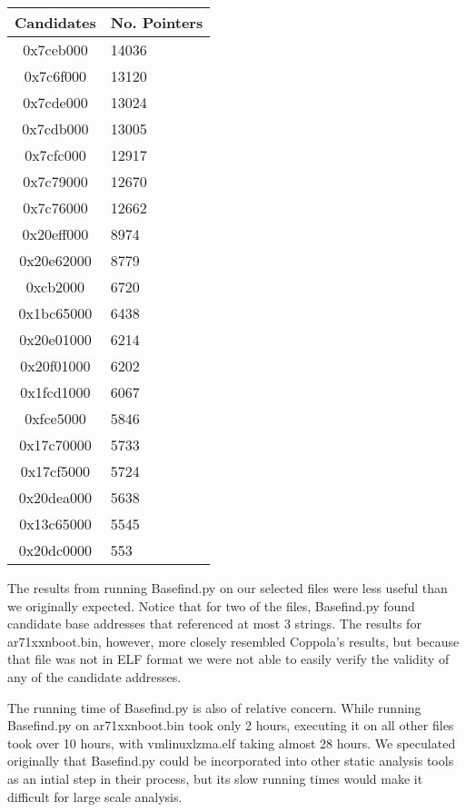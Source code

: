 \documentclass[letterpaper,twocolumn,10pt]{article}
\begin{document}
\begin{center}
    \begin{tabular}{| c | p{3cm} |}
        \hline
        Candidates & No. Pointers\\ \hline
        0x7ceb000 & 14036\\ \hline
        0x7c6f000 & 13120\\ \hline
        0x7cde000 & 13024\\ \hline
        0x7cdb000 & 13005\\ \hline
        0x7cfc000 & 12917\\ \hline
        0x7c79000 & 12670\\ \hline
        0x7c76000 & 12662\\ \hline
        0x20eff000 & 8974\\ \hline
        0x20e62000 & 8779\\ \hline
        0xcb2000 & 6720\\ \hline
        0x1bc65000 & 6438\\ \hline
        0x20e01000 & 6214\\ \hline
        0x20f01000 & 6202\\ \hline
        0x1fcd1000 & 6067\\ \hline
        0xfce5000 & 5846\\ \hline
        0x17c70000 & 5733\\ \hline
        0x17cf5000 & 5724\\ \hline
        0x20dea000 & 5638\\ \hline
        0x13c65000 & 5545\\ \hline
        0x20dc0000 & 553\\ \hline
    \end{tabular}
\end{center}

The results from running Basefind.py on our selected files were less useful than we originally expected. Notice that for two of the files, Basefind.py found candidate base addresses that referenced at most 3 strings. The results for ar71xxnboot.bin, however, more closely resembled Coppola's results, but because that file was not in ELF format we were not able to easily verify the validity of any of the candidate addresses. 

The running time of Basefind.py is also of relative concern. While running Basefind.py on ar71xxnboot.bin took only 2 hours, executing it on all other files took over 10 hours, with vmlinuxlzma.elf taking almost 28 hours. We speculated originally that Basefind.py could be incorporated into other static analysis tools as an intial step in their process, but its slow running times would make it difficult for large scale analysis. 
\end{document}
